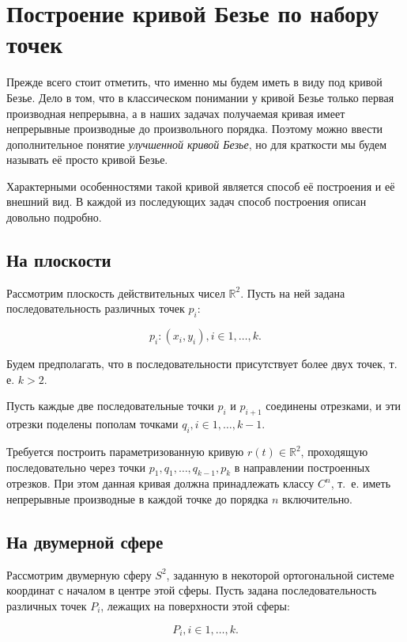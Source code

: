 \section{Построение кривой Безье по набору точек}

Прежде всего стоит отметить, что именно мы будем иметь в виду под кривой Безье. Дело в том, что в классическом
понимании у кривой Безье только первая производная непрерывна, а в наших задачах получаемая кривая имеет непрерывные
производные до произвольного порядка. Поэтому можно ввести дополнительное понятие \textit{улучшенной кривой Безье},
но для краткости мы будем называть её просто кривой Безье.

Характерными особенностями такой кривой является способ её построения и её внешний вид. В каждой из последующих задач
способ построения описан довольно подробно.

\subsection*{На плоскости}

Рассмотрим плоскость действительных чисел $\mathbb{R}^2$. Пусть на ней задана последовательность различных точек $p_i$:

$${p_i: (x_i, y_i)}, i \in {1, \dots, k}.$$

Будем предполагать, что в последовательности присутствует более двух точек, т. е. $k > 2$.

Пусть каждые две последовательные точки $p_i$ и $p_{i+1}$ соединены отрезками, и эти отрезки поделены пополам точками
$q_i, i \in {1, \dots, k-1}$.

Требуется построить параметризованную кривую $r(t) \in \mathbb{R}^2$, проходящую последовательно через точки $p_1,
q_1, \dots, q_{k-1}, p_k$ в направлении построенных отрезков. При этом данная кривая должна принадлежать классу
$C^n$, т.~е. иметь непрерывные производные в каждой точке до порядка $n$ включительно.

\subsection*{На двумерной сфере}

Рассмотрим двумерную сферу $S^2$, заданную в некоторой ортогональной системе координат с началом в центре этой сферы.
Пусть задана последовательность различных точек $P_i$, лежащих на поверхности этой сферы:

$${P_i}, i \in {1, \dots, k}.$$

